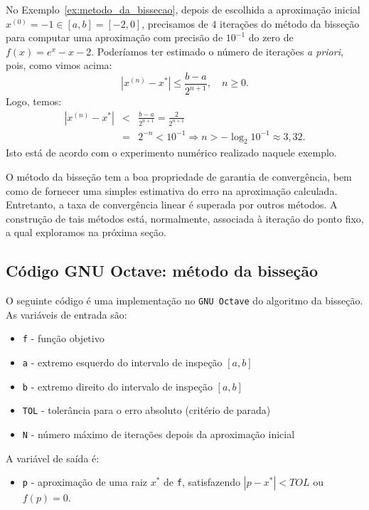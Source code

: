 \begin{ex}
\begin{ex}No Exemplo~\ref{ex:metodo_da_bissecao}, depois de escolhida a aproximação inicial $x^{(0)} = -1 \in [a, b] = [-2, 0]$, precisamos de $4$ iterações do método da bisseção para computar uma aproximação com precisão de $10^{-1}$ do zero de $f(x) = e^x - x - 2$. Poderíamos ter estimado o número de iterações \emph{a priori}, pois, como vimos acima:
  \begin{equation}
    |x^{(n)}-x^*|\leq \frac{b-a}{2^{n+1}},\quad n\geq 0.
  \end{equation}
Logo, temos:
\begin{eqnarray}
  |x^{(n)} - x^*| &<& \frac{b - a}{2^{n+1}} = \frac{2}{2^{n+1}}\\
  &=& 2^{-n} < 10^{-1} \Rightarrow  n > -\log_2 10^{-1} \approx 3,32.
\end{eqnarray}
Isto está de acordo com o experimento numérico realizado naquele exemplo.
\end{ex}

O método da bisseção tem a boa propriedade de garantia de convergência, bem como de fornecer uma simples estimativa do erro na aproximação calculada. Entretanto, a taxa de convergência linear é superada por outros métodos. A construção de tais métodos está, normalmente, associada à iteração do ponto fixo, a qual exploramos na próxima seção.

\subsection{Código GNU Octave: método da bisseção}\label{subsec:codigo_bissecao}

O seguinte código é uma implementação no \verb+GNU Octave+ do algoritmo da bisseção. As variáveis de entrada são:
\begin{itemize}
\item \verb+f+ - função objetivo
\item \verb+a+ - extremo esquerdo do intervalo de inspeção $[a, b]$
\item \verb+b+ - extremo direito do intervalo de inspeção $[a, b]$
\item \verb+TOL+ - tolerância para o erro absoluto (critério de parada)
\item \verb+N+ - número máximo de iterações depois da aproximação inicial
\end{itemize}
A variável de saída é:
\begin{itemize}
\item \verb+p+ - aproximação de uma raiz $x^*$ de \verb+f+, satisfazendo $|p - x^*|< TOL$ ou $f(p) = 0$.
\end{itemize}


\end{ex}
